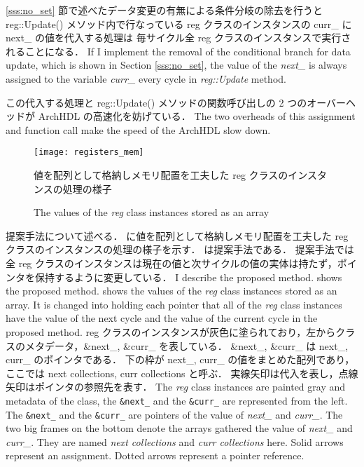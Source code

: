\ref{sss:no_set} 節で述べたデータ変更の有無による条件分岐の除去を行うと reg::Update() メソッド内で行なっている
reg クラスのインスタンスの curr\_ に next\_ の値を代入する処理は
毎サイクル全 reg クラスのインスタンスで実行されることになる．
\fi
If I implement the removal of the conditional branch for data update, which is shown in Section \ref{sss:no_set},
the value of the \textit{next\_} is always assigned to the variable \textit{curr\_} every cycle in \textit{reg::Update} method.

この代入する処理と reg::Update() メソッドの関数呼び出しの 2 つのオーバーヘッドが ArchHDL の高速化を妨げている．
\fi
The two overheads of this assignment and function call make the speed of the ArchHDL slow down.

\begin{figure}[t]
 \centering
 \texttt{[image: registers\_mem]}
 \caption{値を配列として格納しメモリ配置を工夫した reg クラスのインスタンスの処理の様子}
\fi
 \caption{The values of the \textit{reg} class instances stored as an array}
 \label{fig:mem_copy}
\end{figure}

提案手法について述べる．
 に値を配列として格納しメモリ配置を工夫した reg クラスのインスタンスの処理の様子を示す．
 は提案手法である．
提案手法では全 reg クラスのインスタンスは現在の値と次サイクルの値の実体は持たず，ポインタを保持するように変更している．
\fi
I describe the proposed method.
 shows the proposed method.
 shows the values of the \textit{reg} class instances stored as an array.
It is changed into holding each pointer that all of the \textit{reg} class instances have the value of the next cycle and the value of the current cycle in the proposed method.
reg クラスのインスタンスが灰色に塗られており，左からクラスのメタデータ，\&next\_, \&curr\_ を表している．
\&next\_, \&curr\_ は next\_, curr\_ のポインタである．
下の枠が next\_, curr\_ の値をまとめた配列であり，
ここでは next collections, curr collections と呼ぶ．
実線矢印は代入を表し，点線矢印はポインタの参照先を表す．
\fi
The \textit{reg} class instances are painted gray
and metadata of the class, the \texttt{\&next\_} and the \texttt{\&curr\_} are represented from the left.
The \texttt{\&next\_} and the \texttt{\&curr\_} are pointers of the value of \textit{next\_} and \textit{curr\_}.
The two big frames on the bottom denote the arrays gathered the value of \textit{next\_} and \textit{curr\_}.
They are named \textit{next collections} and \textit{curr collections} here.
Solid arrows represent an assignment.
Dotted arrows represent a pointer reference.

